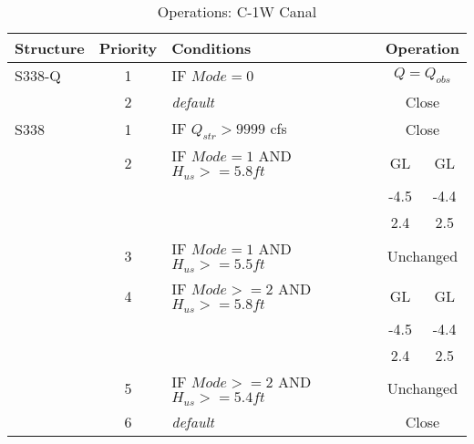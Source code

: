 \scriptsize
\begin{table}[!h]
\centering
\caption{Operations: C-1W Canal}
\label{tab:M11opsC1W}
\begin{tabular}{|l|c|l|c|c|}
\hline
\textbf{Structure} & \textbf{Priority}  & \textbf{Conditions} & \multicolumn{2}{|c|}{\textbf{Operation}}   \\
\hline
\hline
S338-Q        &  1  & IF $Mode=0$                   & \multicolumn{2}{|c|}{$Q = Q_{obs}$}   \\
\hline
              &  2  & \it{default}                  & \multicolumn{2}{|c|}{Close}           \\
\hline
\hline
S338          &  1  & IF $Q_{str}>9999$ cfs                              & \multicolumn{2}{|c|}{Close}   \\
\hline
              &  2  & IF $Mode=1$ AND $H_{us}>=5.8 ft$                   & GL    & GL   \\
              &     &                                                    & -4.5  & -4.4 \\
              &     &                                                    & 2.4   & 2.5  \\
\hline
              &  3  & IF $Mode=1$ AND $H_{us}>=5.5ft$                    & \multicolumn{2}{|c|}{Unchanged}   \\
\hline
              &  4  & IF $Mode>=2$ AND $H_{us}>=5.8 ft$                  & GL    & GL   \\
              &     &                                                    & -4.5  & -4.4 \\
              &     &                                                    & 2.4   & 2.5  \\
\hline
              &  5  & IF $Mode>=2$ AND $H_{us}>=5.4ft$                   & \multicolumn{2}{|c|}{Unchanged}   \\
\hline
              &  6  & \it{default}                                       & \multicolumn{2}{|c|}{Close}   \\

\hline
\hline
\end{tabular}
\end{table}
\normalsize

\clearpage

